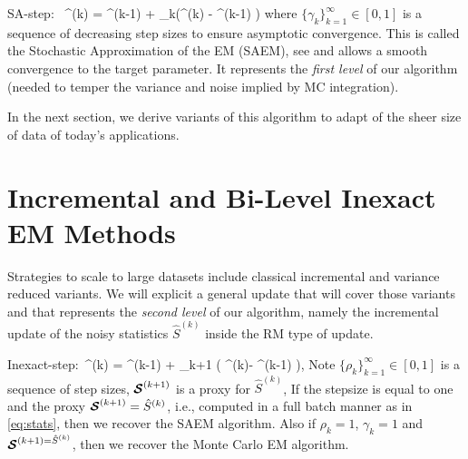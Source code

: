 \documentclass[11pt]{article}
\theoremstyle{t}
\begin{document}
\beq\label{eq:rmstep}
\textsf{SA-step}:~ \hat{\bss}^{(k)} =  \hat{\bss}^{(k-1)}  + \gamma_k(^{(k)} - \hat{\bss}^{(k-1)} )
\eeq
where $\{ \gamma_{k} \}_{k=1}^\infty \in [0,1]$ is a sequence of decreasing step sizes to ensure asymptotic convergence.
This is called the Stochastic Approximation of the EM (SAEM), see \citep{delyon1999} and allows a smooth convergence to the target parameter.
It represents the \textit{first level} of our algorithm (needed to temper the variance and noise implied by MC integration).

In the next section, we derive variants of this algorithm to adapt of the sheer size of data of today's applications.

\section{Incremental and Bi-Level Inexact EM Methods} \label{sec:sEM}
Strategies to scale to large datasets include classical incremental and variance reduced variants.
We will explicit a general update that will cover those variants and that represents the \textit{second level} of our algorithm, namely the incremental update of the noisy statistics $\hat{S}^{(k)}$ inside the RM type of update.

\beq \label{eq:sestep}
\textsf{Inexact-step}:~^{(k)} = ^{(k-1)} + \rho_{k+1} \big( \StocEstep^{(k)}- ^{(k-1)}  \big),
\eeq
Note $\{ \rho_{k} \}_{k=1}^\infty \in [0,1]$ is a sequence of step sizes, ${\bm{\mathcal{S}}}^{(k+1)}$ is a proxy for $\hat{S}^{(k)}$,
If the stepsize is equal to one and the proxy ${\bm{\mathcal{S}}}^{(k+1)} = \hat{S}^{(k)}$, i.e., computed in a full batch manner as in \eqref{eq:stats}, then we recover the SAEM algorithm.
Also if $\rho_{k}=1$, $\gamma_{k}=1$ and ${\bm{\mathcal{S}}}^{(k+1) = \hat{S}^{(k)}}$, then we recover the Monte Carlo EM algorithm.
\end{document}
